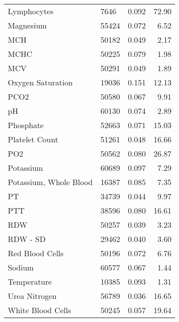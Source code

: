 \begin{table*}[t]
{\begin{tabular}{llrr}
        Lymphocytes & 7646 & 0.092 & 72.90 \\
        Magnesium & 55424 & 0.072 & 6.52 \\
        MCH & 50182 & 0.049 & 2.17 \\
        MCHC & 50225 & 0.079 & 1.98 \\
        MCV & 50291 & 0.049 & 1.89 \\
        Oxygen Saturation & 19036 & 0.151 & 12.13 \\
        PCO2 & 50580 & 0.067 & 9.91 \\
        pH & 60130 & 0.074 & 2.89 \\
        Phosphate & 52663 & 0.071 & 15.03 \\
        Platelet Count & 51261 & 0.048 & 16.66 \\
        PO2 & 50562 & 0.080 & 26.87 \\
        Potassium & 60689 & 0.097 & 7.29 \\
        Potassium, Whole Blood & 16387 & 0.085 & 7.35 \\
        PT & 34739 & 0.044 & 9.97 \\
        PTT & 38596 & 0.080 & 16.61 \\
        RDW & 50257 & 0.039 & 3.23 \\
        RDW - SD & 29462 & 0.040 & 3.60 \\
        Red Blood Cells & 50196 & 0.072 & 6.76 \\
        Sodium & 60577 & 0.067 & 1.44 \\
        Temperature & 10385 & 0.093 & 1.31 \\
        Urea Nitrogen & 56789 & 0.036 & 16.65 \\
        White Blood Cells & 50245 & 0.057 & 19.64 \\
        \bottomrule
    \end{tabular}}
\end{table*}